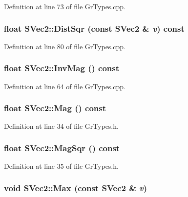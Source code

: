 Definition at line 73 of file GrTypes.cpp.\hypertarget{struct_s_vec2_4add0ea646e454bba57d5c7312a17aab}{
\subsubsection[{DistSqr}]{\setlength{\rightskip}{0pt plus 5cm}float SVec2::DistSqr (const {\bf SVec2} \& {\em v}) const}}
\label{struct_s_vec2_4add0ea646e454bba57d5c7312a17aab}




Definition at line 80 of file GrTypes.cpp.\hypertarget{struct_s_vec2_69d4a12808390dd9954d6f27e26a2d0f}{
\subsubsection[{InvMag}]{\setlength{\rightskip}{0pt plus 5cm}float SVec2::InvMag () const}}
\label{struct_s_vec2_69d4a12808390dd9954d6f27e26a2d0f}




Definition at line 64 of file GrTypes.cpp.\hypertarget{struct_s_vec2_caf2ec0af3ba4f9a3df6fc9ecdcf6cbf}{
\subsubsection[{Mag}]{\setlength{\rightskip}{0pt plus 5cm}float SVec2::Mag () const}}
\label{struct_s_vec2_caf2ec0af3ba4f9a3df6fc9ecdcf6cbf}




Definition at line 34 of file GrTypes.h.\hypertarget{struct_s_vec2_5f6455a9bea6b729e3c8c1124b30fada}{
\subsubsection[{MagSqr}]{\setlength{\rightskip}{0pt plus 5cm}float SVec2::MagSqr () const}}
\label{struct_s_vec2_5f6455a9bea6b729e3c8c1124b30fada}




Definition at line 35 of file GrTypes.h.\hypertarget{struct_s_vec2_32809c8ccf4e0a0c349c584943f5ee04}{
\subsubsection[{Max}]{\setlength{\rightskip}{0pt plus 5cm}void SVec2::Max (const {\bf SVec2} \& {\em v})}}
\label{struct_s_vec2_32809c8ccf4e0a0c349c584943f5ee04}




